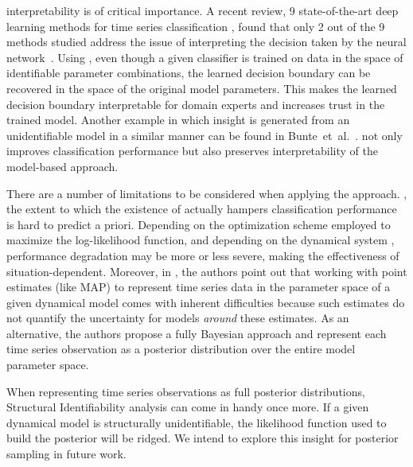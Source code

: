 interpretability is of critical importance.
A recent review,  9 state-of-the-art deep learning methods for time series classification , found that only 2 out of the 9 methods studied address the issue of interpreting the decision taken by the neural network~\cite{ismail2019deep}.
Using \myMethod{}, even though a given classifier is trained on data in the space of identifiable parameter combinations, the learned decision boundary can be recovered in the space of the original model parameters.
This makes the learned decision boundary interpretable for domain experts and increases trust in the trained model.
Another example in which insight is generated from an unidentifiable model in a similar manner can be found in Bunte~et~al.~\cite{bunte2018learning}. 
\myMethod{} not only improves classification performance but also preserves interpretability of the model-based approach.

There are a number of limitations to be considered when applying the \myMethod{} approach.
, the extent to which the existence of  actually hampers classification performance is hard to predict a priori.
Depending on the optimization scheme employed to maximize the log-likelihood function, and depending on the dynamical system , performance degradation may be more or less severe, making the effectiveness of \myMethod{} situation-dependent.
Moreover, in \cite{shen2017classification}, the authors point out that working with point estimates (like MAP) to represent time series data in the parameter space of a given dynamical model comes with inherent difficulties because such estimates do not quantify the uncertainty for models \textit{around} these estimates.
As an alternative, the authors propose a fully Bayesian approach and represent each time series observation as a posterior distribution over the entire model parameter space. 

When representing time series observations as full posterior distributions, Structural Identifiability analysis can come in handy once more.
If a given dynamical model is structurally unidentifiable, the likelihood function used to build the posterior will be ridged.
We intend to explore this insight for posterior sampling in future work.
